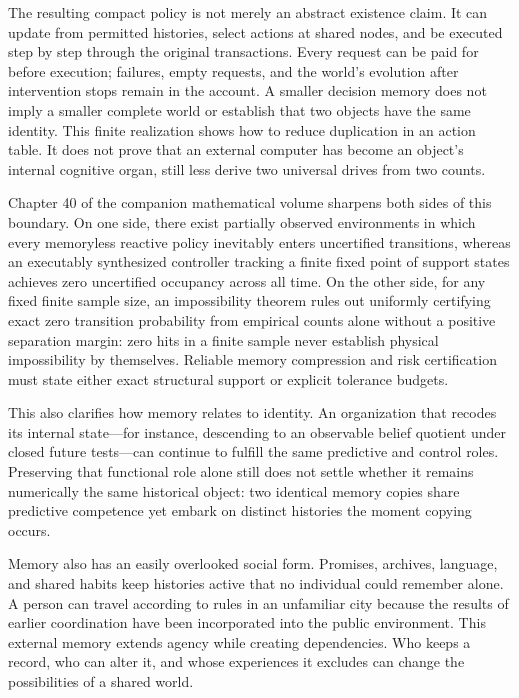 \documentclass[
  english,
  11pt,
  oneside]{book}
\begin{document}
The resulting compact policy is not merely an abstract existence claim. It can update from permitted histories, select actions at shared nodes, and be executed step by step through the original transactions. Every request can be paid for before execution; failures, empty requests, and the world's evolution after intervention stops remain in the account. A smaller decision memory does not imply a smaller complete world or establish that two objects have the same identity. This finite realization shows how to reduce duplication in an action table. It does not prove that an external computer has become an object's internal cognitive organ, still less derive two universal drives from two counts.

Chapter 40 of the companion mathematical volume sharpens both sides of this boundary. On one side, there exist partially observed environments in which every memoryless reactive policy inevitably enters uncertified transitions, whereas an executably synthesized controller tracking a finite fixed point of support states achieves zero uncertified occupancy across all time. On the other side, for any fixed finite sample size, an impossibility theorem rules out uniformly certifying exact zero transition probability from empirical counts alone without a positive separation margin: zero hits in a finite sample never establish physical impossibility by themselves. Reliable memory compression and risk certification must state either exact structural support or explicit tolerance budgets.

This also clarifies how memory relates to identity. An organization that recodes its internal state---for instance, descending to an observable belief quotient under closed future tests---can continue to fulfill the same predictive and control roles. Preserving that functional role alone still does not settle whether it remains numerically the same historical object: two identical memory copies share predictive competence yet embark on distinct histories the moment copying occurs.

Memory also has an easily overlooked social form. Promises, archives, language, and shared habits keep histories active that no individual could remember alone. A person can travel according to rules in an unfamiliar city because the results of earlier coordination have been incorporated into the public environment. This external memory extends agency while creating dependencies. Who keeps a record, who can alter it, and whose experiences it excludes can change the possibilities of a shared world.
\end{document}
